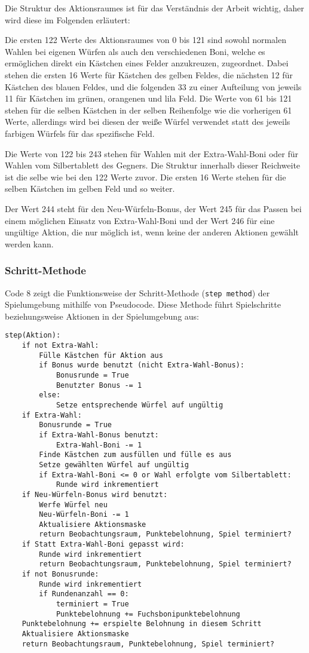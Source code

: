 Die Struktur des Aktionsraumes ist für das Verständnis der Arbeit wichtig, daher wird diese im Folgenden erläutert:

Die ersten 122 Werte des Aktionsraumes von 0 bis 121 sind sowohl normalen Wahlen bei eigenen Würfen als auch den verschiedenen Boni, welche es ermöglichen direkt ein Kästchen eines Felder anzukreuzen, zugeordnet. Dabei stehen die ersten 16 Werte für Kästchen des gelben Feldes, die nächsten 12 für Kästchen des blauen Feldes, und die folgenden 33 zu einer Aufteilung von jeweils 11 für Kästchen im grünen, orangenen und lila Feld. Die Werte von 61 bis 121 stehen für die selben Kästchen in der selben Reihenfolge wie die vorherigen 61 Werte, allerdings wird bei diesen der weiße Würfel verwendet statt des jeweils farbigen Würfels für das spezifische Feld.

Die Werte von 122 bis 243 stehen für Wahlen mit der Extra-Wahl-Boni oder für Wahlen vom Silbertablett des Gegners. Die Struktur innerhalb dieser Reichweite ist die selbe wie bei den 122 Werte zuvor. Die ersten 16 Werte stehen für die selben Kästchen im gelben Feld und so weiter.

Der Wert 244 steht für den Neu-Würfeln-Bonus, der Wert 245 für das Passen bei einem möglichen Einsatz von Extra-Wahl-Boni und der Wert 246 für eine ungültige Aktion, die nur möglich ist, wenn keine der anderen Aktionen gewählt werden kann.
\subsubsection{Schritt-Methode}
\begin{minipage}{\linewidth}
Code 8 zeigt die Funktionsweise der Schritt-Methode (\texttt{step method}) der Spielumgebung mithilfe von Pseudocode. Diese Methode führt Spielschritte beziehungsweise Aktionen in der Spielumgebung aus:
\vspace{0.5cm}
\begin{lstlisting}[caption={Schritt-Methode},morekeywords={Aktion}]
step(Aktion):
	if not Extra-Wahl:
		Fülle Kästchen für Aktion aus
		if Bonus wurde benutzt (nicht Extra-Wahl-Bonus):
			Bonusrunde = True
			Benutzter Bonus -= 1
		else:
			Setze entsprechende Würfel auf ungültig
	if Extra-Wahl:
		Bonusrunde = True
		if Extra-Wahl-Bonus benutzt:
			Extra-Wahl-Boni -= 1
		Finde Kästchen zum ausfüllen und fülle es aus
		Setze gewählten Würfel auf ungültig
		if Extra-Wahl-Boni <= 0 or Wahl erfolgte vom Silbertablett:
			Runde wird inkrementiert
	if Neu-Würfeln-Bonus wird benutzt:
		Werfe Würfel neu
		Neu-Würfeln-Boni -= 1
		Aktualisiere Aktionsmaske
		return Beobachtungsraum, Punktebelohnung, Spiel terminiert?
	if Statt Extra-Wahl-Boni gepasst wird:
		Runde wird inkrementiert
		return Beobachtungsraum, Punktebelohnung, Spiel terminiert?
	if not Bonusrunde:
		Runde wird inkrementiert
		if Rundenanzahl == 0:
			terminiert = True
			Punktebelohnung += Fuchsbonipunktebelohnung
	Punktebelohnung += erspielte Belohnung in diesem Schritt
	Aktualisiere Aktionsmaske
	return Beobachtungsraum, Punktebelohnung, Spiel terminiert?		
\end{lstlisting}
\end{minipage}
